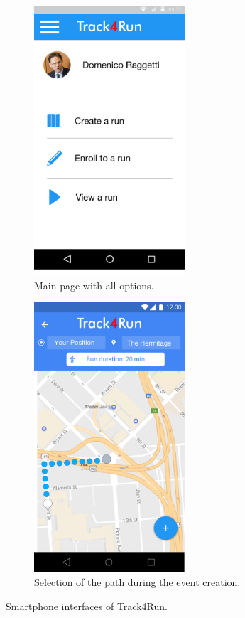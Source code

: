 \documentclass[a4paper]{article}
\begin{document}
\begin{figure}[H]
    \begin{subfigure}{0.5\textwidth}
    \includegraphics[width=160pt]{Track4RunHome} 
    \caption{Main page with all options.}
    \label{fig:subim1}
    \end{subfigure}
    \begin{subfigure}{0.5\textwidth}
    \includegraphics[width=160pt]{Track4Run}
    \caption{Selection of the path during the event creation.}
    \label{fig:subim2}
    \end{subfigure}
\caption{Smartphone interfaces of Track4Run.}
\label{fig:image2}
\end{figure}

\vspace{1cm}
\end{document}
